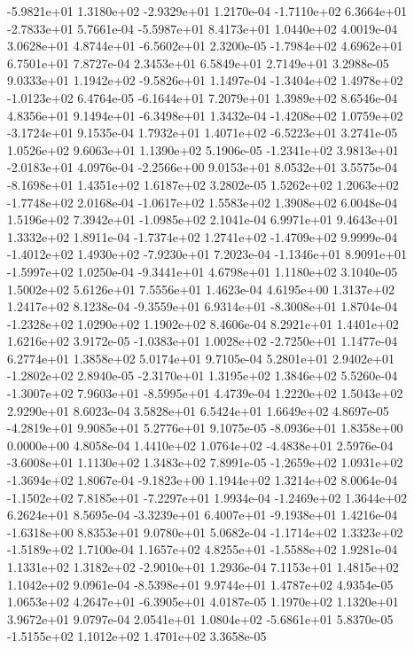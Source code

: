 -5.9821e+01  1.3180e+02 -2.9329e+01  1.2170e-04
-1.7110e+02  6.3664e+01 -2.7833e+01  5.7661e-04
-5.5987e+01  8.4173e+01  1.0440e+02  4.0019e-04
 3.0628e+01  4.8744e+01 -6.5602e+01  2.3200e-05
-1.7984e+02  4.6962e+01  6.7501e+01  7.8727e-04
2.3453e+01 6.5849e+01 2.7149e+01  3.2988e-05
 9.0333e+01  1.1942e+02 -9.5826e+01  1.1497e-04
-1.3404e+02  1.4978e+02 -1.0123e+02  6.4764e-05
-6.1644e+01  7.2079e+01  1.3989e+02  8.6546e-04
 4.8356e+01  9.1494e+01 -6.3498e+01  1.3432e-04
-1.4208e+02  1.0759e+02 -3.1724e+01  9.1535e-04
 1.7932e+01  1.4071e+02 -6.5223e+01  3.2741e-05
1.0526e+02 9.6063e+01 1.1390e+02  5.1906e-05
-1.2341e+02  3.9813e+01 -2.0183e+01  4.0976e-04
-2.2566e+00  9.0153e+01  8.0532e+01  3.5575e-04
-8.1698e+01  1.4351e+02  1.6187e+02  3.2802e-05
 1.5262e+02  1.2063e+02 -1.7748e+02  2.0168e-04
-1.0617e+02  1.5583e+02  1.3908e+02  6.0048e-04
 1.5196e+02  7.3942e+01 -1.0985e+02  2.1041e-04
6.9971e+01 9.4643e+01 1.3332e+02  1.8911e-04
-1.7374e+02  1.2741e+02 -1.4709e+02  9.9999e-04
-1.4012e+02  1.4930e+02 -7.9230e+01  7.2023e-04
-1.1346e+01  8.9091e+01 -1.5997e+02  1.0250e-04
-9.3441e+01  4.6798e+01  1.1180e+02  3.1040e-05
1.5002e+02 5.6126e+01 7.5556e+01  1.4623e-04
4.6195e+00 1.3137e+02 1.2417e+02  8.1238e-04
-9.3559e+01  6.9314e+01 -8.3008e+01  1.8704e-04
-1.2328e+02  1.0290e+02  1.1902e+02  8.4606e-04
8.2921e+01 1.4401e+02 1.6216e+02  3.9172e-05
-1.0383e+01  1.0028e+02 -2.7250e+01  1.1477e-04
6.2774e+01 1.3858e+02 5.0174e+01  9.7105e-04
 5.2801e+01  2.9402e+01 -1.2802e+02  2.8940e-05
-2.3170e+01  1.3195e+02  1.3846e+02  5.5260e-04
-1.3007e+02  7.9603e+01 -8.5995e+01  4.4739e-04
1.2220e+02 1.5043e+02 2.9290e+01  8.6023e-04
3.5828e+01 6.5424e+01 1.6649e+02  4.8697e-05
-4.2819e+01  9.9085e+01  5.2776e+01  9.1075e-05
-8.0936e+01  1.8358e+00  0.0000e+00  4.8058e-04
 1.4410e+02  1.0764e+02 -4.4838e+01  2.5976e-04
-3.6008e+01  1.1130e+02  1.3483e+02  7.8991e-05
-1.2659e+02  1.0931e+02 -1.3694e+02  1.8067e-04
-9.1823e+00  1.1944e+02  1.3214e+02  8.0064e-04
-1.1502e+02  7.8185e+01 -7.2297e+01  1.9934e-04
-1.2469e+02  1.3644e+02  6.2624e+01  8.5695e-04
-3.3239e+01  6.4007e+01 -9.1938e+01  1.4216e-04
-1.6318e+00  8.8353e+01  9.0780e+01  5.0682e-04
-1.1714e+02  1.3323e+02 -1.5189e+02  1.7100e-04
 1.1657e+02  4.8255e+01 -1.5588e+02  1.9281e-04
 1.1331e+02  1.3182e+02 -2.9010e+01  1.2936e-04
7.1153e+01 1.4815e+02 1.1042e+02  9.0961e-04
-8.5398e+01  9.9744e+01  1.4787e+02  4.9354e-05
 1.0653e+02  4.2647e+01 -6.3905e+01  4.0187e-05
1.1970e+02 1.1320e+01 3.9672e+01  9.0797e-04
 2.0541e+01  1.0804e+02 -5.6861e+01  5.8370e-05
-1.5155e+02  1.1012e+02  1.4701e+02  3.3658e-05
